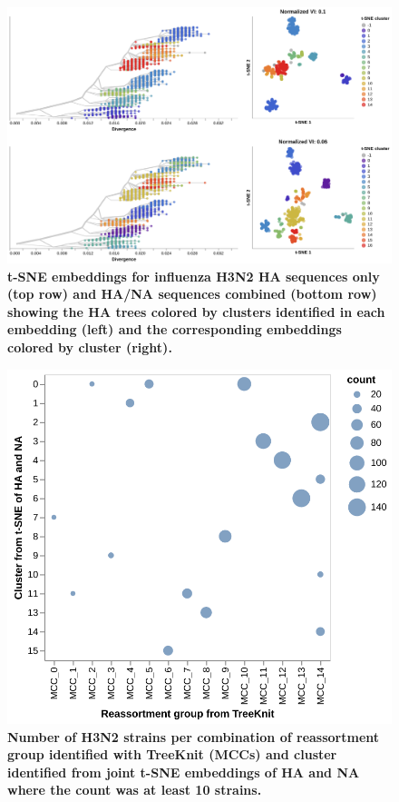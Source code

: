 \begin{figure}[!h]
\includegraphics[width=\columnwidth]{figures/flu-2016-2018-ha-na-tsne-by-cluster.png}
\caption{{\bf t-SNE embeddings for influenza H3N2 HA sequences only (top row) and HA/NA sequences combined (bottom row) showing the HA trees colored by clusters identified in each embedding (left) and the corresponding embeddings colored by cluster (right).}}\label{S_Fig_flu_ha_na_tsne_embeddings}
\end{figure}

\begin{figure}[!h]
\includegraphics[width=\columnwidth]{figures/flu-2016-2018-ha-na-tsne-mcc-counts.png}
\caption{{\bf Number of H3N2 strains per combination of reassortment group identified with TreeKnit (MCCs) and cluster identified from joint t-SNE embeddings of HA and NA where the count was at least 10 strains.}}\label{S_Fig_flu_ha_na_tsne_mcc_counts}
\end{figure}

